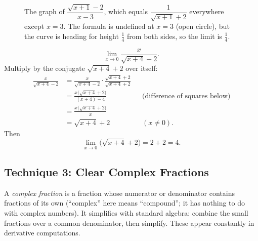 \begin{figure}[htbp]
\centering
{}
\caption{The graph of $\dfrac{\sqrt{x+1}-2}{x-3}$, which equals
$\dfrac{1}{\sqrt{x+1}+2}$ everywhere except $x=3$. The formula is undefined at
$x=3$ (open circle), but the curve is heading for height $\frac14$ from both
sides, so the limit is $\frac14$.}
\label{ch07:fig-rat}
\end{figure}

\begin{example}
\label{ch07:ex-rat2}
\[
  \lim_{x\to 0}\frac{x}{\sqrt{x+4}-2}.
\]
Multiply by the conjugate $\sqrt{x+4}+2$ over itself:
\begin{align*}
  \frac{x}{\sqrt{x+4}-2}
  &= \frac{x}{\sqrt{x+4}-2}\cdot\frac{\sqrt{x+4}+2}{\sqrt{x+4}+2}\\
  &= \frac{x\big(\sqrt{x+4}+2\big)}{(x+4)-4}
    && \text{(difference of squares below)}\\
  &= \frac{x\big(\sqrt{x+4}+2\big)}{x}\\
  &= \sqrt{x+4}+2
    && (x\neq 0).
\end{align*}
Then
\[
  \lim_{x\to 0}\big(\sqrt{x+4}+2\big) = 2+2 = 4.
\]
\end{example}

\subsection{Technique 3: Clear Complex Fractions}
\label{ch07:complexfrac}

A \emph{complex fraction} is a fraction whose numerator or denominator
contains fractions of its own (``complex'' here means ``compound''; it has
nothing to do with complex numbers). It simplifies with standard algebra:
combine the small fractions over a common denominator, then
simplify. These appear constantly in derivative computations.


